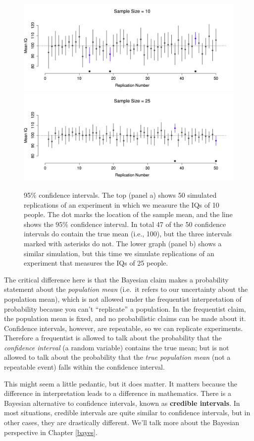 \documentclass[
]{book}
\theoremstyle{definition}
\theoremstyle{definition}
\theoremstyle{definition}
\theoremstyle{definition}
\theoremstyle{remark}
\begin{document}
\begin{figure}

{\centering \includegraphics[width=0.66\linewidth]{resources/image/confIntReplicatedA} \includegraphics[width=0.66\linewidth]{resources/image/confIntReplicatedB} 

}

\caption{95\% confidence intervals. The top (panel a) shows 50 simulated replications of an experiment in which we measure the IQs of 10 people. The dot marks the location of the sample mean, and the line shows the 95\% confidence interval. In total 47 of the 50 confidence intervals do contain the true mean (i.e., 100), but the three intervals marked with asterisks do not. The lower graph (panel b) shows a similar simulation, but this time we simulate replications of an experiment that measures the IQs of 25 people.}\label{fig:cirep}
\end{figure}

The critical difference here is that the Bayesian claim makes a probability statement about the \emph{population mean} (i.e.~it refers to our uncertainty about the population mean), which is not allowed under the frequentist interpretation of probability because you can't ``replicate'' a population. In the frequentist claim, the population mean is fixed, and no probabilistic claims can be made about it. Confidence intervals, however, are repeatable, so we can replicate experiments. Therefore a frequentist is allowed to talk about the probability that the \emph{confidence interval} (a random variable) contains the true mean; but is not allowed to talk about the probability that the \emph{true population mean} (not a repeatable event) falls within the confidence interval.

This might seem a little pedantic, but it does matter. It matters because the difference in interpretation leads to a difference in mathematics. There is a Bayesian alternative to confidence intervals, known as \textbf{credible intervals}. In most situations, credible intervals are quite similar to confidence intervals, but in other cases, they are drastically different. We'll talk more about the Bayesian perspective in Chapter \ref{bayes}.
\end{document}
